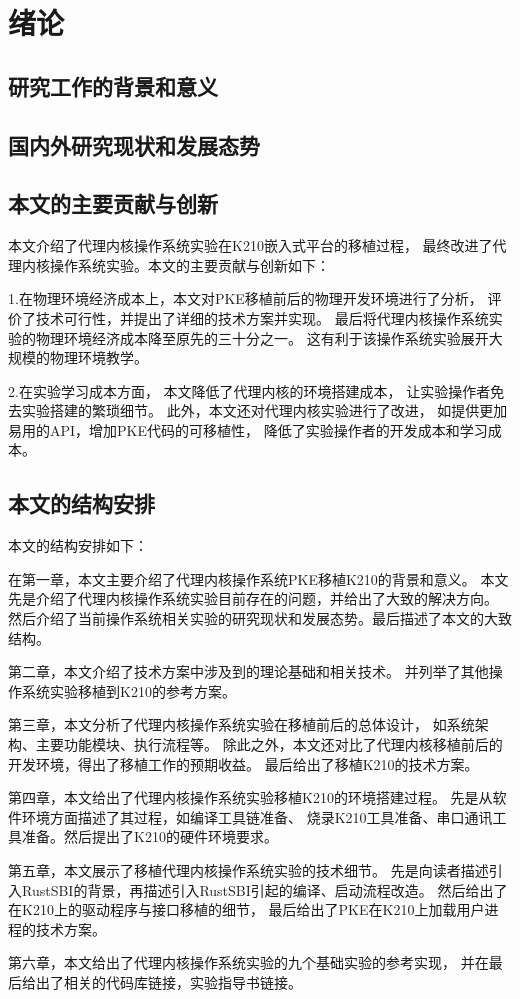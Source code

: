 
\chapter{绪论}

\section{研究工作的背景和意义}

\section{国内外研究现状和发展态势}

\section{本文的主要贡献与创新}

本文介绍了代理内核操作系统实验在K210嵌入式平台的移植过程，
最终改进了代理内核操作系统实验。本文的主要贡献与创新如下：

1.在物理环境经济成本上，本文对PKE移植前后的物理开发环境进行了分析，
评价了技术可行性，并提出了详细的技术方案并实现。
最后将代理内核操作系统实验的物理环境经济成本降至原先的三十分之一。
这有利于该操作系统实验展开大规模的物理环境教学。

2.在实验学习成本方面，
本文降低了代理内核的环境搭建成本，
让实验操作者免去实验搭建的繁琐细节。
此外，本文还对代理内核实验进行了改进，
如提供更加易用的API，增加PKE代码的可移植性，
降低了实验操作者的开发成本和学习成本。

\section{本文的结构安排}

本文的结构安排如下：

在第一章，本文主要介绍了代理内核操作系统PKE移植K210的背景和意义。
本文先是介绍了代理内核操作系统实验目前存在的问题，并给出了大致的解决方向。
然后介绍了当前操作系统相关实验的研究现状和发展态势。最后描述了本文的大致结构。

第二章，本文介绍了技术方案中涉及到的理论基础和相关技术。
并列举了其他操作系统实验移植到K210的参考方案。

第三章，本文分析了代理内核操作系统实验在移植前后的总体设计，
如系统架构、主要功能模块、执行流程等。
除此之外，本文还对比了代理内核移植前后的开发环境，得出了移植工作的预期收益。
最后给出了移植K210的技术方案。

第四章，本文给出了代理内核操作系统实验移植K210的环境搭建过程。
先是从软件环境方面描述了其过程，如编译工具链准备、
烧录K210工具准备、串口通讯工具准备。然后提出了K210的硬件环境要求。

第五章，本文展示了移植代理内核操作系统实验的技术细节。
先是向读者描述引入RustSBI的背景，再描述引入RustSBI引起的编译、启动流程改造。
然后给出了在K210上的驱动程序与接口移植的细节，
最后给出了PKE在K210上加载用户进程的技术方案。

第六章，本文给出了代理内核操作系统实验的九个基础实验的参考实现，
并在最后给出了相关的代码库链接，实验指导书链接。


